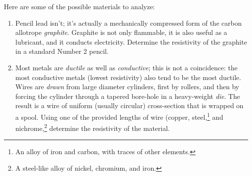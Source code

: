 \documentclass[12pt]{article}
\begin{document}
Here are some of the possible materials to analyze:
\begin{enumerate}
\item Pencil lead isn't; it's actually a mechanically compressed form
  of the carbon allotrope \textit{graphite}.  Graphite is not only
  flammable, it is also useful as a lubricant, and it conducts
  electricity.  Determine the resistivity of the graphite in a
  standard Number 2 pencil.
\item Most metals are \textit{ductile} as well as \textit{conductive};
  this is not a coincidence: the most conductive metals (lowest
  resistivity) also tend to be the most ductile.  Wires are
  \textit{drawn} from large diameter cylinders, first by rollers, and
  then by forcing the cylinder through a tapered bore-hole in a
  heavy-weight \textit{die}.  The result is a wire of uniform (usually
  circular) cross-section that is wrapped on a spool.  Using one of
  the provided lengths of wire (copper, steel,\footnote{An alloy of
    iron and carbon, with traces of other elements.} and
  nichrome,\footnote{A steel-like alloy of nickel, chromium, and
    iron.} determine the resistivity of the material.
\begin{figure}
  \centering
   \qquad
\end{figure}
\end{enumerate}
\end{document}
